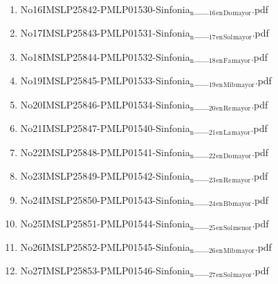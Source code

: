 \documentclass[11pt]{article}
\begin{document}
\begin{enumerate}
\begin{enumerate}
\item No16IMSLP25842-PMLP01530-Sinfonia$_{\text{n}}$\_\_$_{\text{16}}$$_{\text{en}}$$_{\text{Do}}$$_{\text{mayor}}$.pdf
\label{sec-1-1-1-1-44-49-11-57}

\item No17IMSLP25843-PMLP01531-Sinfonia$_{\text{n}}$\_\_$_{\text{17}}$$_{\text{en}}$$_{\text{Sol}}$$_{\text{mayor}}$.pdf
\label{sec-1-1-1-1-44-49-11-58}

\item No18IMSLP25844-PMLP01532-Sinfonia$_{\text{n}}$\_\_$_{\text{18}}$$_{\text{en}}$$_{\text{Fa}}$$_{\text{mayor}}$.pdf
\label{sec-1-1-1-1-44-49-11-59}

\item No19IMSLP25845-PMLP01533-Sinfonia$_{\text{n}}$\_\_$_{\text{19}}$$_{\text{en}}$$_{\text{Mib}}$$_{\text{mayor}}$.pdf
\label{sec-1-1-1-1-44-49-11-60}

\item No20IMSLP25846-PMLP01534-Sinfonia$_{\text{n}}$\_\_$_{\text{20}}$$_{\text{en}}$$_{\text{Re}}$$_{\text{mayor}}$.pdf
\label{sec-1-1-1-1-44-49-11-61}

\item No21IMSLP25847-PMLP01540-Sinfonia$_{\text{n}}$\_\_$_{\text{21}}$$_{\text{en}}$$_{\text{La}}$$_{\text{mayor}}$.pdf
\label{sec-1-1-1-1-44-49-11-62}

\item No22IMSLP25848-PMLP01541-Sinfonia$_{\text{n}}$\_\_$_{\text{22}}$$_{\text{en}}$$_{\text{Do}}$$_{\text{mayor}}$.pdf
\label{sec-1-1-1-1-44-49-11-63}

\item No23IMSLP25849-PMLP01542-Sinfonia$_{\text{n}}$\_\_$_{\text{23}}$$_{\text{en}}$$_{\text{Re}}$$_{\text{mayor}}$.pdf
\label{sec-1-1-1-1-44-49-11-64}

\item No24IMSLP25850-PMLP01543-Sinfonia$_{\text{n}}$\_\_$_{\text{24}}$$_{\text{en}}$$_{\text{Bb}}$$_{\text{mayor}}$.pdf
\label{sec-1-1-1-1-44-49-11-65}

\item No25IMSLP25851-PMLP01544-Sinfonia$_{\text{n}}$\_\_$_{\text{25}}$$_{\text{en}}$$_{\text{Sol}}$$_{\text{menor}}$.pdf
\label{sec-1-1-1-1-44-49-11-66}

\item No26IMSLP25852-PMLP01545-Sinfonia$_{\text{n}}$\_\_$_{\text{26}}$$_{\text{en}}$$_{\text{Mib}}$$_{\text{mayor}}$.pdf
\label{sec-1-1-1-1-44-49-11-67}

\item No27IMSLP25853-PMLP01546-Sinfonia$_{\text{n}}$\_\_$_{\text{27}}$$_{\text{en}}$$_{\text{Sol}}$$_{\text{mayor}}$.pdf
\label{sec-1-1-1-1-44-49-11-68}


\end{enumerate}
\end{enumerate}
\end{document}

